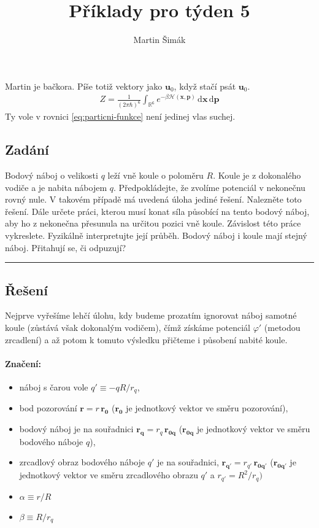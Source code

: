 \documentclass{article}
\title{Příklady pro týden 5}
\author{Martin Šimák}
\date{}
\newcommand{\vecvar}[1]{\boldsymbol{#1}}
\renewcommand{\vec}{\boldsymbol}
\renewcommand{\d}{\mathrm d}
\newcommand{\h}{\hbar}
\begin{document}
	\maketitle
		
	\noindent
	Martin je bačkora. Píše totiž vektory jako $\vecvar u_0$, když stačí psát $\vec u_0$.
	\begin{align}
	\label{eq:particni-funkce}
	\tag{kuchevnik}
		Z = \frac{1}{(2\pi \h)^6}\int_{\mathbb R^6} e^{-\beta \mathcal H(\vec x, \vec p)} \, \d \vec x \, \d \vec p 
	\end{align}
	Ty vole v rovnici \eqref{eq:particni-funkce} není jedinej vlas suchej.
	
	\subsection*{Zadání}
		Bodový  náboj  o  velikosti $q$  leží  vně  koule  o  poloměru $R$.  Koule  je  z dokonalého  vodiče  a  je  nabita nábojem $q$.  Předpokládejte,  že  zvolíme  potenciál  v  nekonečnu  rovný  nule. V takovém  případě  má uvedená úloha jediné řešení. Nalezněte toto řešení. Dále určete práci, kterou musí konat síla působící na tento bodový  náboj, aby ho z nekonečna přesunula na určitou pozici  vně koule. Závislost této práce vykreslete. Fyzikálně interpretujte její průběh. Bodový náboj i koule mají stejný náboj. Přitahují se, či odpuzují? \\
		
		\noindent\rule{8cm}{0.4pt}
	
	\subsection*{Řešení}
		Nejprve vyřešíme lehčí úlohu, kdy budeme prozatím ignorovat náboj samotné koule (zůstává však dokonalým vodičem), čímž získáme potenciál $\varphi'$ (metodou zrcadlení) a až potom k tomuto výsledku přičteme i působení nabité koule. \\
		\paragraph{Značení:}
			\begin{itemize}
				\item náboj s čarou vole $q' \equiv - q R/r_q$,
				\item bod pozorování $\vecvar{r} = r \, \vecvar{r_0}$ ($\vecvar{r_0}$ je jednotkový vektor ve směru pozorování),
				\item bodový náboj je na souřadnici $\vecvar{r_q} = r_q \, \vecvar{r_{0q}}$ ($\vecvar{r_{0q}}$ je jednotkový vektor ve směru bodového náboje $q$),
				\item zrcadlový obraz bodového náboje $q'$ je na souřadnici, $\vecvar{r_{q'}} = r_{q'} \, \vecvar{r_{0q'}}$ ($\vecvar{r_{0q'}}$ je jednotkový vektor ve směru zrcadlového obrazu $q'$ a $r_{q'} = R^2/r_q)$
				\item $\alpha \equiv r/R$
				\item  $\beta \equiv R/r_q$
			\end{itemize}
		
\end{document}
